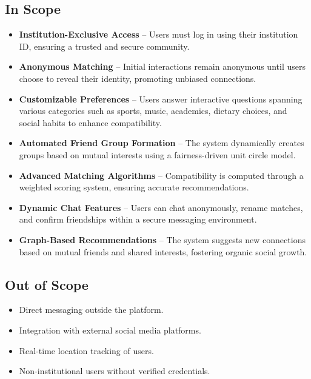 \documentclass{article}
\begin{document}
\subsection{In Scope}
\begin{itemize}
    \item \textbf{Institution-Exclusive Access} – Users must log in using their institution ID, ensuring a trusted and secure community.
    \item \textbf{Anonymous Matching} – Initial interactions remain anonymous until users choose to reveal their identity, promoting unbiased connections.
    \item \textbf{Customizable Preferences} – Users answer interactive questions spanning various categories such as sports, music, academics, dietary choices, and social habits to enhance compatibility.
    \item \textbf{Automated Friend Group Formation} – The system dynamically creates groups based on mutual interests using a fairness-driven unit circle model.
    \item \textbf{Advanced Matching Algorithms} – Compatibility is computed through a weighted scoring system, ensuring accurate recommendations.
    \item \textbf{Dynamic Chat Features} – Users can chat anonymously, rename matches, and confirm friendships within a secure messaging environment.
    \item \textbf{Graph-Based Recommendations} – The system suggests new connections based on mutual friends and shared interests, fostering organic social growth.
\end{itemize}

\subsection{Out of Scope}
\begin{itemize}
    \item Direct messaging outside the platform.
    \item Integration with external social media platforms.
    \item Real-time location tracking of users.
    \item Non-institutional users without verified credentials.
\end{itemize}
\end{document}
